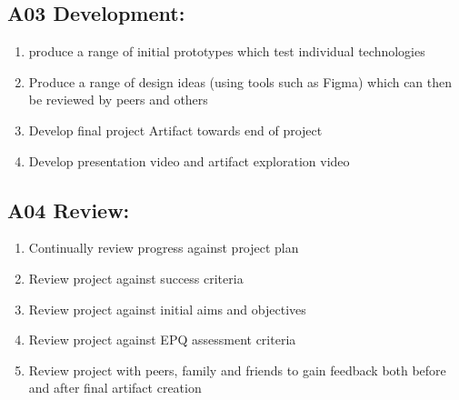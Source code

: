 \subsection{A03 Development:}
\begin{enumerate}
    \item  produce a range of initial prototypes which test individual technologies
    \item Produce a range of design ideas (using tools such as Figma) which can then be reviewed by peers and others
    \item Develop final project Artifact towards end of project
    \item Develop presentation video and artifact exploration video
\end{enumerate}
\subsection{A04 Review:}
\begin{enumerate}
    \item Continually review progress against project plan
    \item Review project against success criteria
    \item Review project against initial aims and objectives
    \item Review project against EPQ assessment criteria
    \item Review project with peers, family and friends to gain feedback both before and after final artifact creation
\end{enumerate}